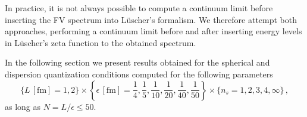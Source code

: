 In practice, it is not always possible to compute a continuum limit before inserting the FV spectrum into L\"{u}scher's formalism.
We therefore attempt both approaches, performing a continuum limit before and after inserting energy levels in L\"{u}scher's zeta function to the obtained spectrum.

In the following section we present results obtained for the spherical and dispersion quantization conditions computed for the following parameters
\begin{equation}
    \{ L \,[\mathrm{fm}]= 1, 2 \}
    \times \left\{ \epsilon \,[\mathrm{fm}] = \frac{1}{4}, \frac{1}{5}, \frac{1}{10}, \frac{1}{20}, \frac{1}{40}, \frac{1}{50} \right\}
    \times \{ n_s = 1, 2, 3, 4, \infty \}
    \, ,
\end{equation}
as long as $N = L / \epsilon \leq 50$.




